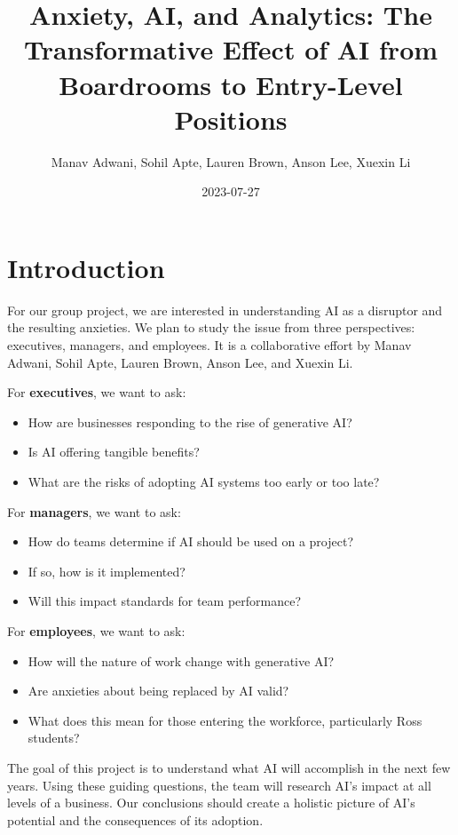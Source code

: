 \documentclass[
]{book}
\title{Anxiety, AI, and Analytics: The Transformative Effect of AI from Boardrooms to Entry-Level Positions}
\author{Manav Adwani, Sohil Apte, Lauren Brown, Anson Lee, Xuexin Li}
\date{2023-07-27}
\providecommand{\tightlist}{%
  \setlength{\itemsep}{0pt}\setlength{\parskip}{0pt}}
\begin{document}
\maketitle

{
\setcounter{tocdepth}{1}
\tableofcontents
}
\hypertarget{introduction}{%
\chapter{Introduction}\label{introduction}}

For our group project, we are interested in understanding AI as a disruptor and the resulting anxieties. We plan to study the issue from three perspectives: executives, managers, and employees. It is a collaborative effort by Manav Adwani, Sohil Apte, Lauren Brown, Anson Lee, and Xuexin Li.

For \textbf{executives}, we want to ask:

\begin{itemize}
\tightlist
\item
  How are businesses responding to the rise of generative AI?
\item
  Is AI offering tangible benefits?
\item
  What are the risks of adopting AI systems too early or too late?
\end{itemize}

For \textbf{managers}, we want to ask:

\begin{itemize}
\tightlist
\item
  How do teams determine if AI should be used on a project?
\item
  If so, how is it implemented?
\item
  Will this impact standards for team performance?
\end{itemize}

For \textbf{employees}, we want to ask:

\begin{itemize}
\tightlist
\item
  How will the nature of work change with generative AI?
\item
  Are anxieties about being replaced by AI valid?
\item
  What does this mean for those entering the workforce, particularly Ross students?
\end{itemize}

The goal of this project is to understand what AI will accomplish in the next few years. Using these guiding questions, the team will research AI's impact at all levels of a business. Our conclusions should create a holistic picture of AI's potential and the consequences of its adoption.
\end{document}
